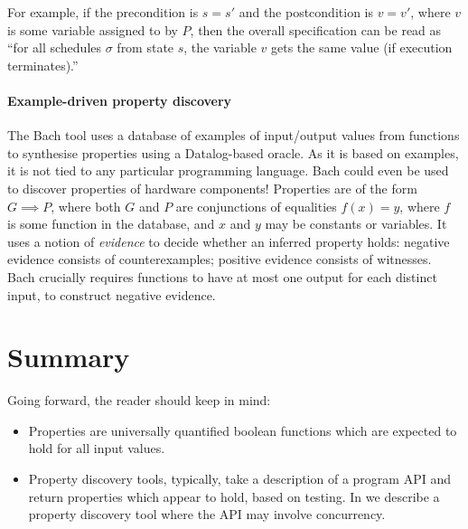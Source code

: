 \noindent
For example, if the precondition is $s = s'$ and the postcondition is
$v = v'$, where $v$ is some variable assigned to by $P$, then the
overall specification can be read as ``for all schedules $\sigma$ from
state $s$, the variable $v$ gets the same value (if execution
terminates).''

\paragraph{Example-driven property discovery}
The Bach\cite{smith2017} tool uses a database of examples of
input/output values from functions to synthesise properties using a
Datalog-based oracle.  As it is based on examples, it is not tied to
any particular programming language.  Bach could even be used to
discover properties of hardware components!  Properties are of the
form $G \implies P$, where both $G$ and $P$ are conjunctions of
equalities $f(x) = y$, where $f$ is some function in the database, and
$x$ and $y$ may be constants or variables.  It uses a notion of
\emph{evidence} to decide whether an inferred property holds: negative
evidence consists of counterexamples; positive evidence consists of
witnesses.  Bach crucially requires functions to have at most one
output for each distinct input, to construct negative evidence.

\section{Summary}

Going forward, the reader should keep in mind:

\begin{itemize}
\item Properties are universally quantified boolean functions which
  are expected to hold for all input values.
\item Property discovery tools, typically, take a description of a
  program API and return properties which appear to hold, based on
  testing.  In  we describe a property discovery tool
  where the API may involve concurrency.
\end{itemize}
